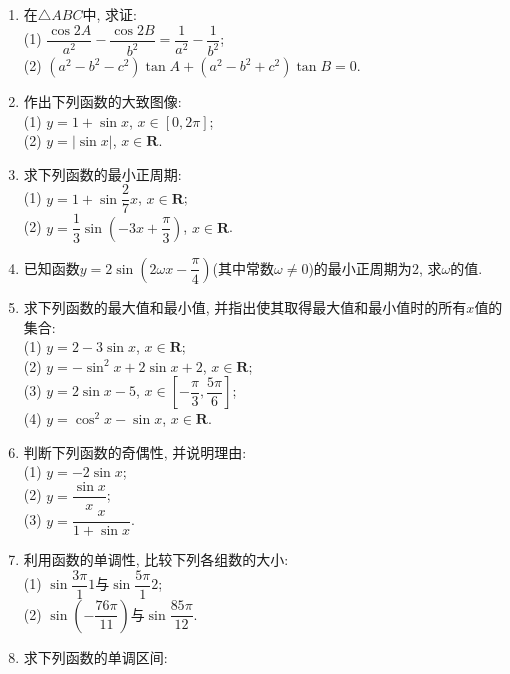 \documentclass[10pt,a4paper]{article}
\begin{document}
\begin{enumerate}[1.]
\begin{center}
\end{center}
\item 在$\triangle ABC$中, 求证:\\
(1) $\dfrac{\cos 2A}{a^2} -\dfrac{\cos 2B}{b^2} =\dfrac1{a^2}-\dfrac 1{b^2}$;\\
(2) $(a^2-b^2-c^2)\tan A+(a^2-b^2+c^2)\tan B=0$.
\item 作出下列函数的大致图像:\\
(1) $y=1+\sin x$, $x\in [0, 2\pi ]$;\\
(2) $y=|\sin x|$, $x\in \mathbf{R}$.
\item 求下列函数的最小正周期:\\
(1) $y=1+\sin \dfrac 27x$, $x\in \mathbf{R}$;\\
(2) $y=\dfrac 13\sin (-3x+\dfrac \pi 3)$, $x\in \mathbf{R}$.
\item 已知函数$y=2\sin (2\omega x-\dfrac \pi 4)$(其中常数$\omega \ne 0$)的最小正周期为$2$, 求$\omega$的值.
\item 求下列函数的最大值和最小值, 并指出使其取得最大值和最小值时的所有$x$值的集合:\\
(1) $y=2-3\sin x$, $x\in \mathbf{R}$;\\
(2) $y=-\sin^2x+2\sin x+2$, $x\in \mathbf{R}$;\\
(3) $y=2\sin x-5$, $x\in [-\dfrac \pi 3, \dfrac{5\pi} 6]$;\\
(4) $y=\cos^2x-\sin x$, $x\in \mathbf{R}$.
\item 判断下列函数的奇偶性, 并说明理由:\\
(1) $y=-2\sin x$;\\
(2) $y=\dfrac{\sin x}x$;\\
(3) $y= \dfrac x{1+\sin x}$.
\item 利用函数的单调性, 比较下列各组数的大小:\\
(1) $\sin \dfrac{3\pi} 11$与$\sin \dfrac{5\pi} 12$;\\
(2) $\sin (-\dfrac{76\pi}{11})$与$\sin \dfrac{85\pi}{12}$.
\item  求下列函数的单调区间:\\

\end{enumerate}
\end{document}
